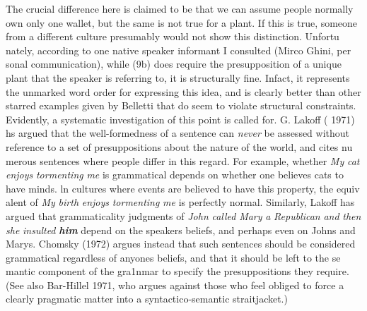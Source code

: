 \begin{styleTextbody}
The crucial difference here is claimed to be that we can assume people normally own only one wallet, but the same is not true for a plant. If this is true, someone from a different culture presumably would not show this distinction. Unfortu\- nately, according to one native speaker informant I consulted (Mirco Ghini, per\- sonal communication), while (9b) does require the presupposition of a unique plant that the speaker is referring to, it is structurally fine. Infact, it represents the unmarked word order for expressing this idea, and is clearly better than other starred examples given by Belletti that do seem to violate structural constraints. Evidently, a systematic investigation of this point is called for. G. Lakoff ( 1971) hs argued that the well-formedness of a sentence can \textit{never}\textit{ }be assessed without reference to a set of presuppositions about the nature of the world, and cites nu\- merous sentences where people differ in this regard. For example, whether \textit{M}\textit{y}\textit{ }\textit{cat}\textit{ }\textit{enjoys}\textit{ }\textit{tormenting}\textit{ }\textit{me}\textit{ }is grammatical depends on whether one believes cats to have minds. ln cultures where events are believed to have this property, the equiv\- alent of \textit{My}\textit{ }\textit{birth}\textit{ }\textit{enjoys}\textit{ }\textit{tormenting}\textit{ }\textit{me}\textit{ }is perfectly normal. Similarly, Lakoff has argued that grammaticality judgments of \textit{John}\textit{ }\textit{called}\textit{ }\textit{Mary}\textit{ }\textit{a}\textit{ }\textit{Republican}\textit{ }\textit{and}\textit{ }\textit{then}\textit{ }\textit{she}\textit{ }\textit{insulted}\textit{ }\textbf{\textit{him}}\textbf{\textit{ }}depend on the speaker{\textquotesingle}s beliefs, and perhaps even on John{\textquotesingle}s and Mary{\textquotesingle}s. Chomsky (1972) argues instead that such sentences should be considered grammatical regardless of anyone{\textquotesingle}s beliefs, and that it should be left to the se\- mantic component of the gra1nmar to specify the presuppositions they require. (See also Bar-Hillel 1971, who argues against those who feel {\textquotedbl}obliged to force a clearly pragmatic matter into a syntactico-semantic straitjacket.{\textquotedbl})
\end{styleTextbody}


